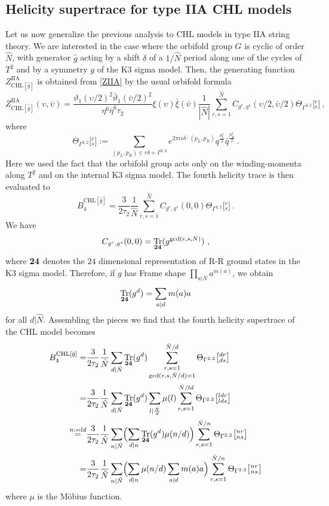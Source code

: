 \documentclass[a4paper,11pt]{article}
\DeclareMathOperator{\Tr}{Tr}
\numberwithin{equation}{section}
\def\be{\begin{equation}}
\def\ee{\end{equation}}
\begin{document}
 \subsection{Helicity supertrace for type IIA CHL models}
 Let us now generalize the previous analysis to CHL models in type IIA string theory. We are interested in the case where the orbifold group $G$ is cyclic of order $\hat N$, with generator $\hat g$ acting by a shift $\delta$ of a $1/\hat N$ period along one of the cycles of $T^2$ and by a symmetry $g$ of the K3 sigma model. Then, the generating function $Z^{\text{IIA}}_{\text{CHL}[\hat g]}$ is obtained  from \eqref{ZIIA}  by the usual orbifold formula
\be Z^{\text{IIA}}_{\text{CHL}[\hat g]}(\upsilon,\bar \upsilon)=\frac{\vartheta_1(\upsilon/2)^2\bar\vartheta_1(\bar\upsilon/2)^2  }{\eta^6\bar\eta^6\tau_2}\xi(\upsilon)\bar\xi(\bar\upsilon)\frac{1}{|\hat N|}\sum_{r,s=1}^{\hat N}C_{g^r,g^s}%
(\upsilon/2,\bar\upsilon/2)\Theta_{\Gamma^{2,2}} \bigl[{}^r_s\bigr]\ ,
\label{CHLpartfun}
\ee 
where 
\be \Theta_{\Gamma^{2,2}} \bigl[{}^r_s\bigr]:=\sum_{(p_L,p_R)\in r\delta+\Gamma^{2,2}} e^{2\pi is \delta \cdot (p_L,p_R)} q^{\frac{p_L^2}{2}}
\bar q^{\frac{p_R^2}{2}}\ .
\ee
Here we used the fact that the orbifold group acts only on the winding-momenta along $T^2$ and on the internal K3 sigma model. The fourth helicity trace is then evaluated to
\be B_4^{\text{CHL}[\hat g]}=\frac{3}{2\tau_2}\frac{1}{\hat N}\sum_{r,s=1}^{ \hat N}C_{g^r,g^s}%
(0,0)\Theta_{\Gamma^{2,2}} \bigl[{}^r_s\bigr]\ .
\ee  We have
\be C_{g^r,g^s}%
(0,0) = \Tr_{\bf 24} (g^{\gcd(r,s,N)})\ ,
\ee where ${\bf 24}$ denotes the $24$ dimensional representation of R-R ground states in the K3 sigma model. Therefore, if $g$ has Frame shape $\prod_{a|N} a^{m(a)}$, we obtain
\be \Tr_{\bf 24} (g^d)=\sum_{a|d}m(a)a
\ee for all  $d|\hat N$. Assembling the pieces we find that the fourth helicity supertrace of the CHL model becomes 
\begin{align} B_4^{\text{CHL}[\hat g]}= &\frac{3}{2\tau_2}\frac{1}{\hat N}\sum_{d|\hat N} \Tr_{\bf 24} (g^d)\sum_{\substack{r,s=1\\ \gcd(r,s,\hat N/d)=1}}^{ \hat N/d}\Theta_{\Gamma^{2,2}} \bigl[{}^{dr}_{ds}\bigr]\\= &\frac{3}{2\tau_2}\frac{1}{\hat N}\sum_{d|\hat N} \Tr_{\bf 24} (g^d)\sum_{l|\frac{\hat N}{d}}\mu(l)\sum_{r,s=1}^{ \hat N/ld}\Theta_{\Gamma^{2,2}} \bigl[{}^{ldr}_{lds}\bigr]\\
\stackrel{n:=ld}{=}&\frac{3}{2\tau_2}\frac{1}{\hat N}\sum_{n|\hat N}\Bigl(\sum_{d|n} \Tr_{\bf 24} (g^d)\mu(n/d)\Bigr)\sum_{r,s=1}^{ \hat N/n}\Theta_{\Gamma^{2,2}} \bigl[{}^{nr}_{ns}\bigr]
\\
=&\frac{3}{2\tau_2}\frac{1}{\hat N}\sum_{n|\hat N}\Bigl(\sum_{d|n} \mu(n/d)\sum_{a|d}m(a)a\Bigr)\sum_{r,s=1}^{ \hat N/n}\Theta_{\Gamma^{2,2}} \bigl[{}^{nr}_{ns}\bigr]
\end{align} where $\mu$ is the M\"obius function.
\end{document}
